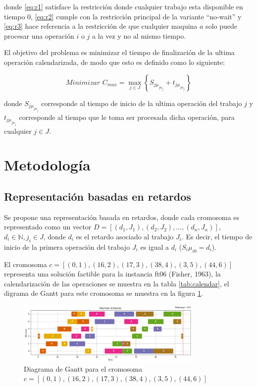 \documentclass[12pt,a4paper]{article}
\begin{document}
    donde \ref{eq:r1} satisface la restricción donde cualquier trabajo esta disponible en tiempo 0, \ref{eq:r2} cumple con la restricción principal de la variante ``no-wait'' y \ref{eq:r3} hace referencia a la restricción de que cualquier maquina $a$ solo puede procesar una operación $i$ o $j$ a la vez y no al mismo tiempo.
    
    El objetivo del problema es minimizar el tiempo de finalización de la ultima operación calendarizada, de modo que esto es definido como lo siguiente: 
    
    \begin{equation}
        \textit{Minimizar } C_{max} = \max_{j \in J} \left\{ S_{j\mu_{jn_j}} + t_{j\mu_{jn_j}} \right\} 
    \end{equation}
    
    donde $S_{j\mu_{jn_j}}$ corresponde al tiempo de inicio de la ultima operación del trabajo $j$ y $t_{j\mu_{jn_j}}$ corresponde al tiempo que le toma ser procesada dicha operación, para cualquier $j \in J$.
\section{Metodología}

\subsection{Representación basadas en retardos}

Se propone una representación basada en retardos, donde cada cromosoma es representado como un vector $D = [(d_1, J_1), (d_2, J_2), \ldots, (d_n, J_n)]$, $d_i \in \mathbb{N} , j_i \in J$, donde $d_i$ es el retardo asociado al trabajo $J_i$. Es decir, el tiempo de inicio de la primera operación del trabajo $J_i$ es igual a $d_i$ ($S_i\mu_{i0} = d_i$). 

El cromosoma $c = [(0, 1), (16, 2), (17, 3), (38, 4), (3, 5), (44, 6)]$ representa una solución factible para la instancia ft06 (Fisher, 1963), la calendarización de las operaciones se muestra en la tabla \ref{tab:calendar}, el digrama de Gantt para este cromosoma se muestra en la figura \ref{fig:gant1}.

\begin{figure}[H]
    \centering
    \includegraphics[width=0.8\textwidth]{Figure/gant1.png}
    \caption{Diagrama de Gantt para el cromosoma $c = [(0, 1), (16, 2), (17, 3), (38, 4), (3, 5), (44, 6)]$}
    \label{fig:gant1}
\end{figure}
\end{document}
